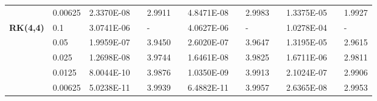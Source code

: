 \documentclass[preprint,compress,3p,10pt,fleqn]{elsarticle}
\numberwithin{equation}{section}
\begin{document}
\begin{table}[H]
\begin{tabular}{lllllrlrlrlrlrl}
\multicolumn{2}{l}{} & \multicolumn{2}{l}{0.00625} & 2.3370E-08 &       & 2.9911  &       & 4.8471E-08 &       & 2.9983  &       & 1.3375E-05 &       & 1.9927  \\
\multicolumn{2}{l}{\multirow{5}[1]{*}{\textbf{RK(4,4)}}} & \multicolumn{2}{l}{0.1} & 3.0741E-06 &       & -     &       & 4.0627E-06 &       & -     &       & 1.0278E-04 &       & - \\
\multicolumn{2}{l}{} & \multicolumn{2}{l}{0.05} & 1.9959E-07 &       & 3.9450  &       & 2.6020E-07 &       & 3.9647  &       & 1.3195E-05 &       & 2.9615  \\
\multicolumn{2}{l}{} & \multicolumn{2}{l}{0.025} & 1.2698E-08 &       & 3.9744  &       & 1.6461E-08 &       & 3.9825  &       & 1.6711E-06 &       & 2.9811  \\
\multicolumn{2}{l}{} & \multicolumn{2}{l}{0.0125} & 8.0044E-10 &       & 3.9876  &       & 1.0350E-09 &       & 3.9913  &       & 2.1024E-07 &       & 2.9906  \\
\multicolumn{2}{l}{} & \multicolumn{2}{l}{0.00625} & 5.0238E-11 &       & 3.9939  &       & 6.4882E-11 &       & 3.9957  &       & 2.6365E-08 &       & 2.9953  \\
\bottomrule
\end{tabular}%
\label{tab:6-4}%
\end{table}%
		
\end{document}

